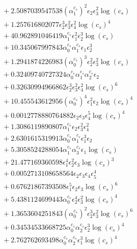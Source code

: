 \documentclass[10pt]{article}
\begin{document}
\begin{align*}
&{}  + 2.5087039547538 \left(\alpha_{1}^{c_s}\right)^{2} \epsilon_{2} \epsilon_{3}^{2} \log{\left(c_{s} \right)} \\
&{}  + 1.257616802077 \epsilon_{2}^{3} \epsilon_{3}^{2} \epsilon_{4}^{2} \log{\left(c_{s} \right)}^{4} \\
&{}  + 40.962891046419 \alpha_{1}^{c_s} \epsilon_{1}^{2} \epsilon_{2}^{3} \log{\left(c_{s} \right)} \\
&{}  + 10.345067997843 \alpha_{0}^{c_s} \alpha_{1}^{c_s} \epsilon_{1} \epsilon_{2}^{3} \\
&{}  + 1.2941874226983 \left(\alpha_{0}^{c_s}\right)^{3} \epsilon_{2}^{2} \epsilon_{3}^{2} \log{\left(c_{s} \right)} \\
&{}  + 0.32409740727324 \alpha_{0}^{c_s} \alpha_{1}^{c_s} \alpha_{2}^{c_s} \epsilon_{2} \\
&{}  + 0.32630994966862 \epsilon_{2}^{3} \epsilon_{3}^{2} \epsilon_{4}^{2} \log{\left(c_{s} \right)}^{6} \\
&{}  + 10.455543612956 \left(\alpha_{0}^{c_s}\right)^{4} \epsilon_{1}^{2} \epsilon_{2} \log{\left(c_{s} \right)}^{4} \\
&{}  + 0.0012778880764882 \epsilon_{2} \epsilon_{3} \epsilon_{4}^{5} \log{\left(c_{s} \right)}^{4} \\
&{}  + 1.3086119890807 \alpha_{1}^{c_s} \epsilon_{2} \epsilon_{3}^{2} \epsilon_{4}^{2} \\
&{}  + 2.6301615319913 \alpha_{0}^{c_s} \alpha_{1}^{c_s} \epsilon_{1}^{3} \epsilon_{2} \\
&{}  + 5.3058524288054 \alpha_{1}^{c_s} \alpha_{3}^{c_s} \epsilon_{1} \log{\left(c_{s} \right)} \\
&{}  + 21.477169360598 \epsilon_{1}^{4} \epsilon_{2}^{2} \epsilon_{3} \log{\left(c_{s} \right)}^{3} \\
&{}  + 0.0052713108658564 \epsilon_{2} \epsilon_{3} \epsilon_{4} \epsilon_{5}^{4} \\
&{}  + 0.67621867393508 \epsilon_{1}^{5} \epsilon_{2} \epsilon_{3} \log{\left(c_{s} \right)}^{6} \\
&{}  + 5.4381124699443 \alpha_{0}^{c_s} \epsilon_{2}^{4} \epsilon_{3}^{2} \log{\left(c_{s} \right)}^{4} \\
&{}  + 1.3653604251843 \left(\alpha_{0}^{c_s}\right)^{2} \epsilon_{2}^{3} \epsilon_{3}^{2} \log{\left(c_{s} \right)}^{6} \\
&{}  + 0.34534533668725 \alpha_{0}^{c_s} \alpha_{2}^{c_s} \epsilon_{2}^{3} \log{\left(c_{s} \right)}^{4} \\
&{}  + 2.762762693498 \alpha_{0}^{c_s} \alpha_{2}^{c_s} \epsilon_{1}^{3} \log{\left(c_{s} \right)}^{4} \\

\end{align*}
\end{document}
